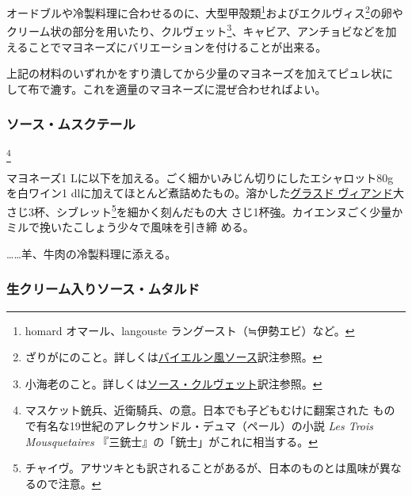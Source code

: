 \begin{recette}
オードブルや冷製料理に合わせるのに、大型甲殻類\footnote{homard
  オマール、langouste ラングースト（≒伊勢エビ）など。}およびエクルヴィス\footnote{ざりがにのこと。詳しくは\protect\hyperlink{sauce-bavaroise}{バイエルン風ソース}訳注参照。}の卵や
クリーム状の部分を用いたり、クルヴェット\footnote{小海老のこと。詳しくは\protect\hyperlink{sauce-aux-crevettes}{ソース・クルヴェット}訳注参照。}、キャビア、アンチョビなどを加
えることでマヨネーズにバリエーションを付けることが出来る。

上記の材料のいずれかをすり潰してから少量のマヨネーズを加えてピュレ状に
して布で漉す。これを適量のマヨネーズに混ぜ合わせればよい。

\maeaki

\hypertarget{sauce-mousquetaire}{%
\subsubsection{ソース・ムスクテール}\label{sauce-mousquetaire}}

\footnote{マスケット銃兵、近衛騎兵、の意。日本でも子どもむけに翻案された
  もので有名な19世紀のアレクサンドル・デュマ（ペール）の小説 \emph{Les
  Trois Mousquetaires} 『三銃士』の「銃士」がこれに相当する。}


マヨネーズ1 Lに以下を加える。ごく細かいみじん切りにしたエシャロット80g
を白ワイン1\undemi{}
dlに加えてほとんど煮詰めたもの。溶かした\protect\hyperlink{glace-de-viande}{グラスド
ヴィアンド}大さじ3杯、シブレット\footnote{チャイヴ。アサツキとも訳されることがあるが、日本のものとは風味が異なるので注意。}を細かく刻んだもの大
さじ1杯強。カイエンヌごく少量かミルで挽いたこしょう少々で風味を引き締
める。

\ldots{}\ldots{}羊、牛肉の冷製料理に添える。

\maeaki

\hypertarget{sauce-moutarde-a-la-creme}{%
\subsubsection{生クリーム入りソース・ムタルド}\label{sauce-moutarde-a-la-creme}}


\end{recette}
